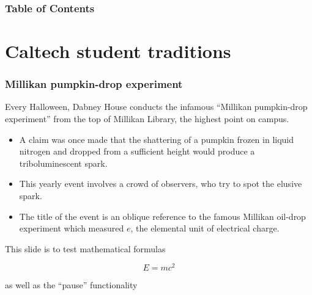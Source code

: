 \begin{frame}
\frametitle{Table of Contents}
\tableofcontents
\end{frame}
\section{Caltech student traditions}
\begin{frame}
\frametitle{Millikan pumpkin-drop experiment}
Every Halloween, Dabney House conducts the infamous ``Millikan pumpkin-drop experiment'' from the top of Millikan Library, the highest point on campus.

\begin{itemize}
    \item<1-> A claim was once made that the shattering of a pumpkin frozen in liquid nitrogen and dropped from a sufficient height would produce a triboluminescent spark. 
    \item<2-> This yearly event involves a crowd of observers, who try to spot the elusive spark.
    \item<3-> The title of the event is an oblique reference to the famous Millikan oil-drop experiment which measured $e$, the elemental unit of electrical charge.
\end{itemize}

\end{frame}
\begin{frame}  
This slide is to test mathematical formulas

$$E=mc^2$$ 

as well as the ``pause'' functionality
\end{frame}
